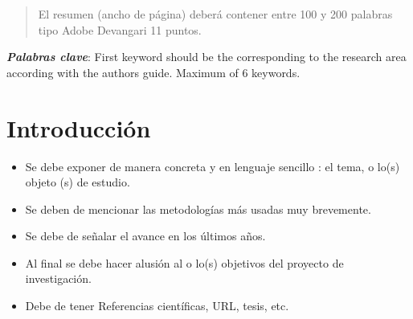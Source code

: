     
    
    
    \maketitle
    \thispagestyle{fancy}
    
    
    
    \begin{abstract}
    \noindent 
    El resumen (ancho de página) deberá contener entre 100 y 200 palabras tipo Adobe Devangari 11 puntos.
    
    \end{abstract}
    \textbf{\textit{Palabras clave}}: {First keyword should be the corresponding to the research area according with the authors guide. Maximum of 6 keywords.}
    
    \section{Introducción}
    
    \begin{itemize}
        \item Se debe exponer de manera concreta y en lenguaje sencillo : el tema, o lo(s) objeto (s) de estudio. 
        \item Se deben de mencionar las metodologías más usadas muy brevemente. 
        \item Se debe de señalar el avance en los últimos años.
        \item Al final se debe hacer alusión al o lo(s) objetivos del proyecto de investigación.
        \item Debe de tener Referencias científicas, URL, tesis, etc.
    \end{itemize}
